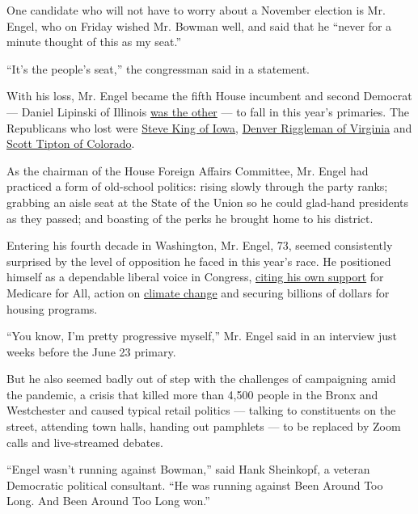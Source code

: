 One candidate who will not have to worry about a November election is
Mr. Engel, who on Friday wished Mr. Bowman well, and said that he
``never for a minute thought of this as my seat.''

``It's the people's seat,'' the congressman said in a statement.

With his loss, Mr. Engel became the fifth House incumbent and second
Democrat --- Daniel Lipinski of Illinois
\href{https://www.nytimes.com/2020/03/18/us/politics/marie-newman-dan-lipinski-illinois.html}{was
the other} --- to fall in this year's primaries. The Republicans who
lost were
\href{https://www.nytimes.com/2020/06/03/us/politics/steve-king-iowa-primary.html}{Steve
King of Iowa},
\href{https://www.nytimes.com/2020/06/14/us/politics/denver-riggleman-virginia-primary-bob-good.html}{Denver
Riggleman of Virginia} and
\href{https://www.nytimes.com/2020/06/30/us/lauren-boebert-colorado.html}{Scott
Tipton of Colorado}.

As the chairman of the House Foreign Affairs Committee, Mr. Engel had
practiced a form of old-school politics: rising slowly through the party
ranks; grabbing an aisle seat at the State of the Union so he could
glad-hand presidents as they passed; and boasting of the perks he
brought home to his district.

Entering his fourth decade in Washington, Mr. Engel, 73, seemed
consistently surprised by the level of opposition he faced in this
year's race. He positioned himself as a dependable liberal voice in
Congress,
\href{https://engelforcongress.com/priorities/healthcare/}{citing his
own support} for Medicare for All, action on
\href{https://engelforcongress.com/priorities/climate-change/}{climate
change} and securing billions of dollars for housing programs.

``You know, I'm pretty progressive myself,'' Mr. Engel said in an
interview just weeks before the June 23 primary.

But he also seemed badly out of step with the challenges of campaigning
amid the pandemic, a crisis that killed more than 4,500 people in the
Bronx and Westchester and caused typical retail politics --- talking to
constituents on the street, attending town halls, handing out pamphlets
--- to be replaced by Zoom calls and live-streamed debates.

``Engel wasn't running against Bowman,'' said Hank Sheinkopf, a veteran
Democratic political consultant. ``He was running against Been Around
Too Long. And Been Around Too Long won.''

